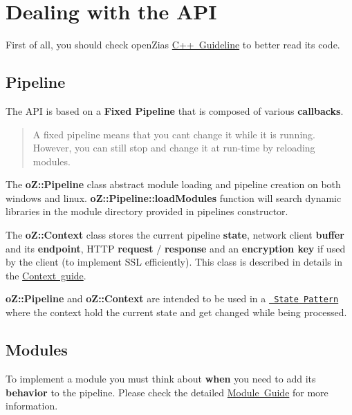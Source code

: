 \section*{Dealing with the A\+PI}

First of all, you should check open\+Zia\textquotesingle{}s \mbox{\hyperlink{md_GUIDELINE}{C++ Guideline}} to better read its code.

\subsection*{Pipeline}

The A\+PI is based on a {\bfseries{Fixed Pipeline}} that is composed of various {\bfseries{callbacks}}.

\begin{quote}
A fixed pipeline means that you can\textquotesingle{}t change it while it is running. However, you can still stop and change it at run-\/time by reloading modules. \end{quote}


The {\bfseries{o\+Z\+::\+Pipeline}} class abstract module loading and pipeline creation on both windows and linux. {\bfseries{o\+Z\+::\+Pipeline\+::load\+Modules}} function will search dynamic libraries in the module directory provided in pipeline\textquotesingle{}s constructor.

The {\bfseries{o\+Z\+::\+Context}} class stores the current pipeline {\bfseries{state}}, network client {\bfseries{buffer}} and its {\bfseries{endpoint}}, H\+T\+TP {\bfseries{request}} / {\bfseries{response}} and an {\bfseries{encryption key}} if used by the client (to implement S\+SL efficiently). This class is described in details in the \mbox{\hyperlink{md_CONTEXT}{Context guide}}.

{\bfseries{o\+Z\+::\+Pipeline}} and {\bfseries{o\+Z\+::\+Context}} are intended to be used in a \href{https://en.wikipedia.org/wiki/State_pattern}{\texttt{ State Pattern}} where the context hold the current state and get changed while being processed.

\subsection*{Modules}

To implement a module you must think about {\bfseries{when}} you need to add its {\bfseries{behavior}} to the pipeline. Please check the detailed \mbox{\hyperlink{md_MODULE}{Module Guide}} for more information.

